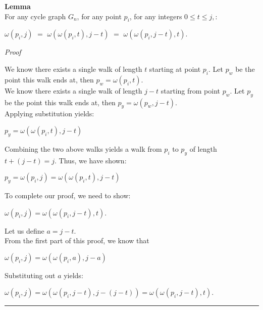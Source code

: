\documentclass[a4paper,12pt]{article}
\begin{document}
\label{lemma:composition_of_sub_walks}
\begin{tcolorbox}
\textbf{Lemma}\\
For any cycle graph $G_n$, for any point $p_i$, for any integers $0 \leq t \leq j,$:
\begin{center}
$\omega(p_i, j)$ $=$ $\omega(\omega(p_i, t), j - t)$ $=$ $\omega(\omega(p_i, j - t), t)$. 
\end{center}
\end{tcolorbox}

\noindent
\textit{Proof}

\noindent We know there exists a single walk of length $t$ starting at point $p_i$.
Let $p_w$ be the point this walk ends at, then $p_w = \omega(p_i, t)$.\\

\noindent We know there exists a single walk of length $j - t$ starting from point $p_w$.
Let $p_y$ be the point this walk ends at, then $p_y = \omega(p_w, j - t)$.\\
Applying substitution yields:

\begin{center}
$p_y = \omega(\omega(p_i, t), j - t)$
\end{center}

\noindent Combining the two above walks yields a walk from $p_i$ to $p_y$ of length\\
$t + (j - t) = j$. Thus, we have shown:
\begin{center}
$p_y = \omega(p_i, j) = \omega(\omega(p_i, t), j - t)$
\end{center}

\noindent To complete our proof, we need to show:
\begin{center}
$\omega(p_i, j) = \omega(\omega(p_i, j - t), t)$.
\end{center}

\noindent Let us define $a = j - t$.\\

\noindent From the first part of this proof, we know that
\begin{center}
$\omega(p_i, j) = \omega(\omega(p_i, a), j - a)$
\end{center}

\noindent Substituting out $a$ yields:
\begin{center}
$\omega(p_i, j) = \omega(\omega(p_i, j - t), j - (j - t)) = \omega(\omega(p_i, j - t), t)$.
\end{center}

\begin{center}
\noindent\rule{8cm}{0.4pt}
\end{center}
\end{document}
